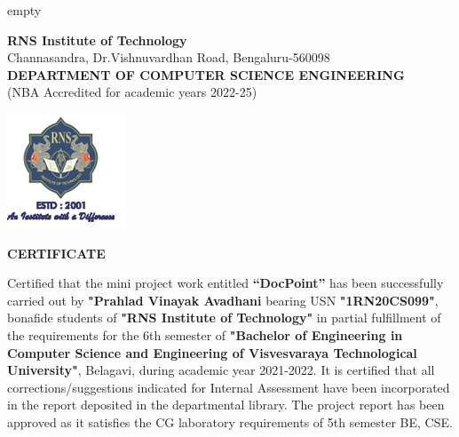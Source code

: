 
\newenvironment{certificate1}

	\clearpage\thispagestyle{empty}
	
	\begin{center}	
			\textbf{RNS Institute of Technology}\\
{\footnotesize{Channasandra, Dr.Vishnuvardhan Road, Bengaluru-560098}}\\
\textbf{DEPARTMENT OF COMPUTER SCIENCE  ENGINEERING} \\
{\footnotesize{(NBA Accredited for academic years 2022-25)}}\\
\end{center}
	
	\begin{center}
		\includegraphics[scale=0.8]{logo.png}	
	\end{center}
	\begin{center}
		\textbf{CERTIFICATE}
	\end{center}
	
Certified that the mini project work entitled \textbf{“DocPoint”} has been successfully carried out by  \textbf{"Prahlad Vinayak Avadhani} bearing USN  \textbf{"1RN20CS099"}, bonafide students of  \textbf{"RNS Institute of Technology"} in partial fulfillment of the requirements for the 6th semester  of  \textbf{"Bachelor of Engineering in Computer Science and Engineering of Visvesvaraya Technological University"}, Belagavi, during academic year 2021-2022. It is certified that all corrections/suggestions indicated for Internal Assessment have been incorporated in the report deposited in the departmental library. The project report has been approved as it satisfies the CG laboratory requirements of 5th semester BE, CSE. 	
\\
	
